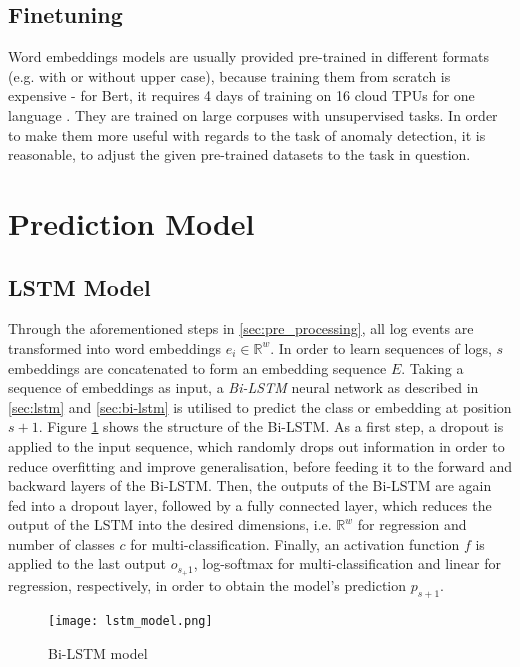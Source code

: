 \subsection{Finetuning\label{sec:finetuning}}
Word embeddings models are usually provided pre-trained in different formats (e.g. with or without upper case), because training them from scratch is expensive - for Bert, it requires 4 days of training on 16 cloud TPUs for one language \cite{googlebert}. They are trained on large corpuses with unsupervised tasks. In order to make them more useful with regards to the task of anomaly detection, it is reasonable, to adjust the given pre-trained datasets to the task in question. 






\section{Prediction Model\label{sec:prediction_model}}

\subsection{LSTM Model\label{sec:lstm-model}}
Through the aforementioned steps in \ref{sec:pre_processing}, all log events are transformed into word embeddings $e_i \in \mathbb{R}^w$. In order to learn sequences of logs, $s$ embeddings are concatenated to form an embedding sequence $E$. Taking a sequence of embeddings as input, a \textit{Bi-LSTM} neural network as described in \ref{sec:lstm} and \ref{sec:bi-lstm} is utilised to predict the class or embedding at position $s+1$. Figure \ref{fig:lstm_model} shows the structure of the Bi-LSTM. As a first step, a dropout is applied to the input sequence, which randomly drops out information in order to reduce overfitting and improve generalisation, before feeding it to the forward and backward layers of the Bi-LSTM. Then, the outputs of the Bi-LSTM are again fed into a dropout layer, followed by a fully connected layer, which reduces the output of the LSTM into the desired dimensions, i.e. $\mathbb{R}^w$ for regression and number of classes $c$ for multi-classification. Finally, an activation function $f$ is applied to the last output $o_{s_+1}$, log-softmax for multi-classification and linear for regression, respectively, in order to obtain the model's prediction $p_{s+1}$.


\begin{figure}[H]
	\centering	
	\texttt{[image: lstm\_model.png]}
	\caption{Bi-LSTM model}
	\label{fig:lstm_model}
\end{figure}

